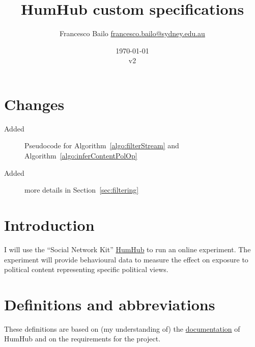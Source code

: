 \documentclass[a4paper]{article}
\title{HumHub custom specifications}
\author{Francesco Bailo \href{mailto:francesco.bailo@sydney.edu.au}{francesco.bailo@sydney.edu.au}}
\date{\today\\v2}
\begin{document}
\maketitle

\section{Changes}
  \begin{description}
  \item [Added] Pseudocode for Algorithm~\ref{algo:filterStream} and Algorithm~\ref{algo:inferContentPolOp}
   \item [Added] more details in Section~\ref{sec:filtering}
  \end{description}

\section{Introduction}

I will use the ``Social Network Kit'' \href{https://www.humhub.org/}{HumHub} to run an online experiment. The experiment will provide behavioural data to measure the effect on exposure to political content representing specific political views.

\section{Definitions and abbreviations}

These definitions are based on (my understanding of) the \href{http://docs.humhub.org/index.html}{documentation} of HumHub and on the requirements for the project.
\end{document}
